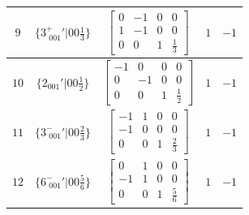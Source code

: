 \documentclass[fleqn,8pt]{jsarticle}
\begin{document}
\begin{longtable}{ccccc}
$ 9 $ & $ \{3^{+}_{\,\,001}{}'|0 0 \frac{1}{3}\} $ & $ \begin{bmatrix} 0 & -1 & 0 & 0 \\ 1 & -1 & 0 & 0 \\ 0 & 0 & 1 & \frac{1}{3} \end{bmatrix} $ & $ 1 $ & $ -1 $ \\ \hline
$ 10 $ & $ \{2{}_{001}{}'|0 0 \frac{1}{2}\} $ & $ \begin{bmatrix} -1 & 0 & 0 & 0 \\ 0 & -1 & 0 & 0 \\ 0 & 0 & 1 & \frac{1}{2} \end{bmatrix} $ & $ 1 $ & $ -1 $ \\ \hline
$ 11 $ & $ \{3^{-}_{\,\,001}{}'|0 0 \frac{2}{3}\} $ & $ \begin{bmatrix} -1 & 1 & 0 & 0 \\ -1 & 0 & 0 & 0 \\ 0 & 0 & 1 & \frac{2}{3} \end{bmatrix} $ & $ 1 $ & $ -1 $ \\ \hline
$ 12 $ & $ \{6^{-}_{\,\,001}{}'|0 0 \frac{5}{6}\} $ & $ \begin{bmatrix} 0 & 1 & 0 & 0 \\ -1 & 1 & 0 & 0 \\ 0 & 0 & 1 & \frac{5}{6} \end{bmatrix} $ & $ 1 $ & $ -1 $ \\
\end{longtable}
\end{document}
